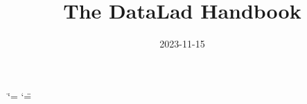 \documentclass[letterpaper,10pt,english,twoside]{sphinxmanual}
\title{The DataLad Handbook}
\date{2023-11-15}
\author{}
\begin{document}
\ifdefined\shorthandoff
  \ifnum\catcode`\=\string=\active\shorthandoff{=}\fi
  \ifnum\catcode`\"=\active{}\fi
\fi

\pagestyle{empty}
\newcommand{\withauthors}{\mbox{Laura Waite}, \mbox{Kyle Meyer}, \mbox{Marisa Heckner}, \mbox{Benjamin Poldrack}, \mbox{Yaroslav Halchenko}, \mbox{Chris Markiewicz}, \mbox{Pattarawat Chormai}, \mbox{Lisa N. Mochalski}, \mbox{Lisa Wiersch}, \mbox{Jean-Baptiste Poline}, \mbox{Nevena Kraljevic}, \mbox{Alex Waite}, \mbox{Lya K. Paas}, \mbox{Niels Reuter}, \mbox{Peter Vavra}, \mbox{Tobias Kadelka}, \mbox{Peer Herholz}, \mbox{Alexandre Hutton}, \mbox{Sarah Oliveira}, \mbox{Dorian Pustina}, \mbox{Hamzah Hamid Baagil}, \mbox{Tristan Glatard}, \mbox{Giulia Ippoliti}, \mbox{Christian Mönch}, \mbox{Togaru Surya Teja}, \mbox{Dorien Huijser}, \mbox{Ariel Rokem}, \mbox{Remi Gau}, \mbox{Judith Bomba}, \mbox{Konrad Hinsen}, \mbox{Wu Jianxiao}, \mbox{Małgorzata Wierzba}, \mbox{Stefan Appelhoff}, \mbox{Michael Joseph}, \mbox{Tamara Cook}, \mbox{Stephan Heunis}, \mbox{Joerg Stadler}, \mbox{Sin Kim}, \mbox{Oscar Esteban}, \mbox{Michał Szczepanik}, \mbox{Eduard Ort}, \mbox{Myrskyta}, \mbox{Thomas Guiot}, \mbox{Julius Breuer}, \mbox{Ikko Ashimine}, \mbox{Arshitha Basavaraj}, \mbox{Anthony J Veltri}, \mbox{Isil Bilgin}, \mbox{Julian Kosciessa}, \mbox{Isaac To}, \mbox{Austin Macdonald}, \mbox{Christopher S. Hall}, \mbox{John C. Ford}, \mbox{Julien Colomb}, \mbox{Danny Garside}}

\pagestyle{plain}
\sphinxtableofcontents
\pagestyle{normal}
\label{\detokenize{book_main::doc}}


\mainmatter

 \fancyhead[LE]{\small\thepage}
 \fancyhead[RO]{\small\thepage}
 \fancyhead[RE]{\small\nouppercase{\leftmark}}
 \fancyhead[LO]{\small\nouppercase{\rightmark}}
 \fancyfoot{}
 \fancyfoot[LE]{}
 \renewcommand*{\footrule}{}%

\sphinxstepscope
\end{document}
